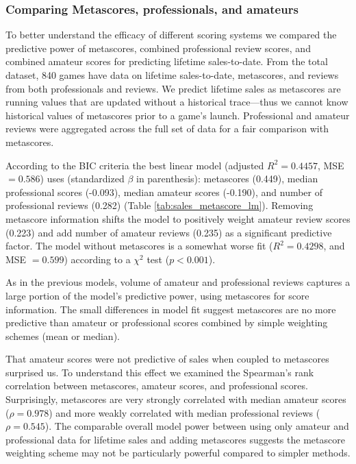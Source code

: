 \documentclass[letterpaper]{article}
\begin{document}
\subsubsection{Comparing Metascores, professionals, and amateurs}
To better understand the efficacy of different scoring systems we compared the predictive power of metascores, combined professional review scores, and combined amateur scores for predicting lifetime sales-to-date. From the total dataset, 840 games have data on lifetime sales-to-date, metascores, and reviews from both professionals and reviews. We predict lifetime sales as metascores are running values that are updated without a historical trace---thus we cannot know historical values of metascores prior to a game's launch. Professional and amateur reviews were aggregated across the full set of data for a fair comparison with metascores.

According to the BIC criteria the best linear model (adjusted $R^2 = 0.4457$, MSE $= 0.586$) uses (standardized $\beta$ in parenthesis): metascores (0.449), median professional scores (-0.093), median amateur scores (-0.190), and number of professional reviews (0.282) (Table \ref{tab:sales_metascore_lm}). Removing metascore information shifts the model to positively weight amateur review scores (0.223) and add number of amateur reviews (0.235) as a significant predictive factor. The model without metascores is a somewhat worse fit ($R^2 = 0.4298$, and MSE $= 0.599$) according to a $\chi^2$ test ($p < 0.001$).

As in the previous models, volume of amateur and professional reviews captures a large portion of the model's predictive power, using metascores for score information. The small differences in model fit suggest metascores are no more predictive than amateur or professional scores combined by simple weighting schemes (mean or median). 

That amateur scores were not predictive of sales when coupled to metascores surprised us. To understand this effect we examined the Spearman's rank correlation between metascores, amateur scores, and professional scores. Surprisingly, metascores are very strongly correlated with median amateur scores ($\rho = 0.978$) and more weakly correlated with median professional reviews ($\rho = 0.545$). The comparable overall model power between using only amateur and professional data for lifetime sales and adding metascores suggests the metascore weighting scheme may not be particularly powerful compared to simpler methods.
\end{document}
